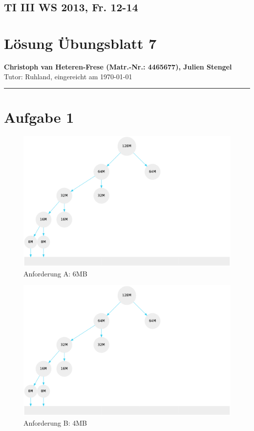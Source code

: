 \documentclass[11pt, a4paper]{scrartcl}
\begin{document}
\lstset{basicstyle=\small,
		 inputencoding=latin1,
		stringstyle=\ttfamily,
		identifierstyle=,
		showstringspaces=false,
		language=c,
		frame=trBL}
%
\subsection*{TI III WS 2013, Fr. 12-14}
\section*{Lösung Übungsblatt 7}
\textbf{Christoph van Heteren-Frese (Matr.-Nr.: 4465677), Julien  Stengel } \\%
Tutor: Ruhland, eingereicht am \today\\
\hrule
%
\section*{Aufgabe 1}
\begin{figure}[H]
\center
\includegraphics[scale=0.32]{a1_1}
\caption{Anforderung A: 6MB}
\end{figure}
\begin{figure}[H]
\center
\includegraphics[scale=0.32	]{a1_1}
\caption{Anforderung B: 4MB}
\end{figure}
\end{document}
